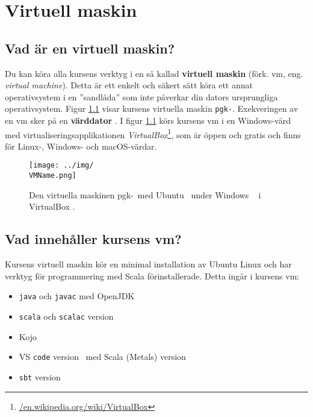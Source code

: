 
\chapter{Virtuell maskin}\label{appendix:vbox}

\section{Vad är en virtuell maskin?}

Du kan köra alla kursens verktyg i en så kallad \textbf{virtuell maskin} (förk. vm, eng. \textit{virtual machine}). 
Detta är ett enkelt och säkert sätt köra ett annat operativsystem i en ''sandlåda'' som inte påverkar din dators ursprungliga operativsystem. Figur \ref{fig:vm} visar kursens virtuella maskin \texttt{pgk-\VMName}. Exekveringen av en vm sker på en \textbf{värddator} . I figur \ref{fig:vm} körs kursens vm i en Windows-värd med virtualiseringsapplikationen \textit{VirtualBox}\footnote{\href{https://en.wikipedia.org/wiki/VirtualBox}{/en.wikipedia.org/wiki/VirtualBox}}, som är öppen och gratis och finns för Linux-, Windows- och macOS-värdar. 



\begin{figure}[H]
\centering
\texttt{[image: ../img/\\VMName.png]}
\caption{Den virtuella maskinen pgk-\VMName~med Ubuntu \UbuntuVersion~under Windows \WindowsVersion~ i VirtualBox \VirtualBoxVersion.}
\label{fig:vm}
\end{figure}


\section{Vad innehåller kursens vm?}

Kursens virtuell maskin kör en minimal installation av Ubuntu Linux och har verktyg för programmering med Scala förinstallerade. Detta ingår i kursens vm:

\begin{itemize}
\item \texttt{java} och \texttt{javac} med OpenJDK \JDKVersion
\item \texttt{scala} och \texttt{scalac} version \ScalaVersion
\item Kojo \KojoVersion
\item VS \texttt{code} version \VSCodeVersion~med Scala (Metals) version \MetalsVersion
\item \texttt{sbt} version \SbtVersion
\end{itemize}

